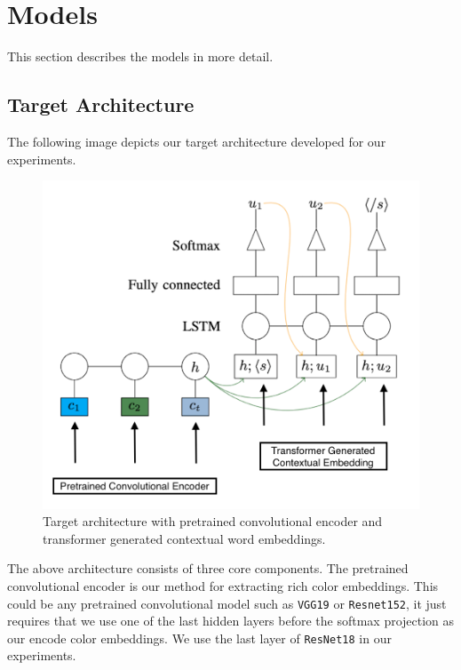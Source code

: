 \section{Models}

This section describes the models in more detail.

\subsection{Target Architecture}
The following image depicts our target architecture developed for our experiments.

\begin{figure}[ht]
\centering
\includegraphics[width=\columnwidth]{assets/target_architecture.png}
\caption[Target Architecture]
{Target architecture with pretrained convolutional encoder and transformer generated contextual word embeddings.}
\label{overview}
\end{figure}

\par
The above architecture consists of three core components. The pretrained convolutional encoder is our method for extracting rich color embeddings. This could be any pretrained convolutional model such as \texttt{VGG19} or \texttt{Resnet152}, it just requires that we use one of the last hidden layers before the softmax projection as our encode color embeddings. We use the last layer of \texttt{ResNet18} in our experiments.

